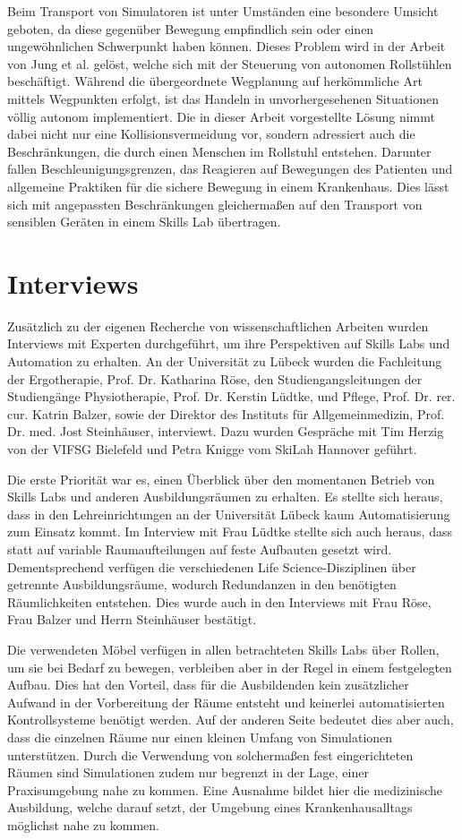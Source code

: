 Beim Transport von Simulatoren ist unter Umständen eine besondere Umsicht geboten, da diese gegenüber Bewegung empfindlich sein oder einen ungewöhnlichen Schwerpunkt haben können. Dieses Problem wird in der Arbeit von Jung et al. \cite{wheelchairPlan} gelöst, welche sich mit der Steuerung von autonomen Rollstühlen beschäftigt. Während die übergeordnete Wegplanung auf herkömmliche Art mittels Wegpunkten erfolgt, ist das Handeln in unvorhergesehenen Situationen völlig autonom implementiert. Die in dieser Arbeit vorgestellte Lösung nimmt dabei nicht nur eine Kollisionsvermeidung vor, sondern adressiert auch die Beschränkungen, die durch einen Menschen im Rollstuhl entstehen. Darunter fallen Beschleunigungsgrenzen, das Reagieren auf Bewegungen des Patienten und allgemeine Praktiken für die sichere Bewegung in einem Krankenhaus. Dies lässt sich mit angepassten Beschränkungen gleichermaßen auf den Transport von sensiblen Geräten in einem Skills Lab übertragen.


\section{Interviews}

Zusätzlich zu der eigenen Recherche von wissenschaftlichen Arbeiten wurden Interviews mit Experten durchgeführt, um ihre Perspektiven auf Skills Labs und Automation zu erhalten. An der Universität zu Lübeck wurden die Fachleitung der Ergotherapie, Prof. Dr. Katharina Röse, den Studiengangsleitungen der Studiengänge Physiotherapie, Prof. Dr. Kerstin Lüdtke, und Pflege, Prof. Dr. rer. cur. Katrin Balzer, sowie der Direktor des Instituts für Allgemeinmedizin, Prof. Dr. med. Jost Steinhäuser, interviewt. Dazu wurden Gespräche mit Tim Herzig von der VIFSG Bielefeld und Petra Knigge vom SkiLah Hannover geführt.

Die erste Priorität war es, einen Überblick über den momentanen Betrieb von Skills Labs und anderen Ausbildungsräumen zu erhalten. Es stellte sich heraus, dass in den Lehreinrichtungen an der Universität Lübeck kaum Automatisierung zum Einsatz kommt. Im Interview mit Frau Lüdtke stellte sich auch heraus, dass statt auf variable Raumaufteilungen auf feste Aufbauten gesetzt wird. Dementsprechend verfügen die verschiedenen Life Science-Disziplinen über getrennte Ausbildungsräume, wodurch Redundanzen in den benötigten Räumlichkeiten entstehen. Dies wurde auch in den Interviews mit Frau Röse, Frau Balzer und Herrn Steinhäuser bestätigt.

Die verwendeten Möbel verfügen in allen betrachteten Skills Labs über Rollen, um sie bei Bedarf zu bewegen, verbleiben aber in der Regel in einem festgelegten Aufbau. Dies hat den Vorteil, dass für die Ausbildenden kein zusätzlicher Aufwand in der Vorbereitung der Räume entsteht und keinerlei automatisierten Kontrollsysteme benötigt werden. Auf der anderen Seite bedeutet dies aber auch, dass die einzelnen Räume nur einen kleinen Umfang von Simulationen unterstützen. Durch die Verwendung von solchermaßen fest eingerichteten Räumen sind Simulationen zudem nur begrenzt in der Lage, einer Praxisumgebung nahe zu kommen. Eine Ausnahme bildet hier die medizinische Ausbildung, welche darauf setzt, der Umgebung eines Krankenhausalltags möglichst nahe zu kommen.

